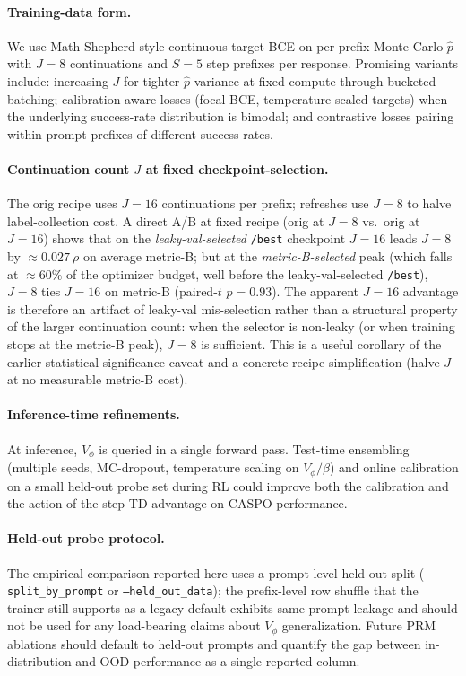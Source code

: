\documentclass[11pt]{article}
\newcommand{\caspo}{\textsc{CASPO}}
\begin{document}
\paragraph{Training-data form.}
We use Math-Shepherd-style continuous-target BCE on per-prefix Monte
Carlo $\widehat{p}$ with $J=8$ continuations and $S=5$ step prefixes
per response. Promising variants include: increasing $J$ for tighter
$\widehat{p}$ variance at fixed compute through bucketed batching;
calibration-aware losses (focal BCE, temperature-scaled targets) when
the underlying success-rate distribution is bimodal; and contrastive
losses pairing within-prompt prefixes of different success rates.

\paragraph{Continuation count $J$ at fixed checkpoint-selection.}
The orig recipe uses $J{=}16$ continuations per prefix; refreshes
use $J{=}8$ to halve label-collection cost. A direct A/B at fixed
recipe (orig at $J{=}8$ vs.\ orig at $J{=}16$) shows that on the
\emph{leaky-val-selected} \texttt{/best} checkpoint $J{=}16$ leads
$J{=}8$ by ${\approx}0.027~\rho$ on average metric-B; but at the
\emph{metric-B-selected} peak (which falls at ${\approx}60\%$ of the
optimizer budget, well before the leaky-val-selected
\texttt{/best}), $J{=}8$ ties $J{=}16$ on metric-B (paired-$t$
$p{=}0.93$). The apparent $J{=}16$ advantage is therefore an artifact
of leaky-val mis-selection rather than a structural property of the
larger continuation count: when the selector is non-leaky (or when
training stops at the metric-B peak), $J{=}8$ is sufficient. This
is a useful corollary of the earlier statistical-significance caveat
and a concrete recipe simplification (halve $J$ at no measurable
metric-B cost).

\paragraph{Inference-time refinements.}
At inference, $V_\phi$ is queried in a single forward pass. Test-time
ensembling (multiple seeds, MC-dropout, temperature scaling on
$V_\phi/\beta$) and online calibration on a small held-out probe set
during RL could improve both the calibration and the action of the
step-TD advantage on \caspo{} performance.

\paragraph{Held-out probe protocol.}
The empirical comparison reported here uses a prompt-level held-out
split (\texttt{--split\_by\_prompt} or \texttt{--held\_out\_data}); the
prefix-level row shuffle that the trainer still supports as a legacy
default exhibits same-prompt leakage and should not be used for any
load-bearing claims about $V_\phi$ generalization. Future PRM
ablations should default to held-out prompts and quantify the gap
between in-distribution and OOD performance as a single reported
column.
\end{document}
